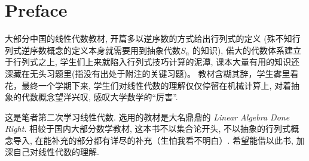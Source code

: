 \chapter{Preface}

大部分中国的线性代数教材, 开篇多以逆序数的方式给出行列式的定义
(殊不知行列式逆序数概念的定义本身就需要用到抽象代数\(S_{n}\) 的知识), 偌大的代数体系建立于行列式之上,
学生们上来就陷入行列式技巧计算的泥潭, 课本大量有用的知识还深藏在无头习题里(指没有出处于附注的关键习题)。
教材含糊其辞，学生雾里看花，最终一个学期下来,
学生们对线性代数的理解仅仅停留在机械计算上, 对着抽象的代数概念望洋兴叹, 感叹大学数学的``厉害''.

这是笔者第二次学习线性代数. 选用的教材是大名鼎鼎的 \emph{Linear Algebra Done
Right}.
相较于国内大部分数学教材, 这本书不以集合论开头, 不以抽象的行列式概念导入,
在能补充的部分都有详尽的补充（生怕我看不明白）. 希望能借以此书, 加深自己对线性代数的理解.
